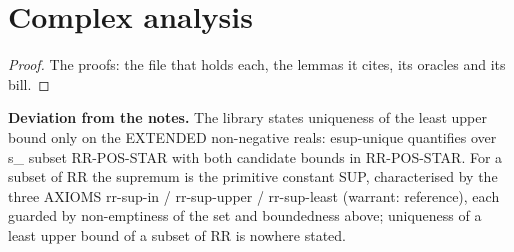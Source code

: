 \section{Complex analysis}
%
\renewcommand{\thethm}{1.2}
\begin{prop}\label{thm:esup-unique}
%
%
\end{prop}
%
\begin{proof}
%
The proofs: the file that holds each, the lemmas it cites, its oracles and its bill.
%
%
%
%
\end{proof}
%
\noindent\textbf{Deviation from the notes.} The library states uniqueness of the least upper bound only on the EXTENDED non-negative reals: esup-unique quantifies over s\_ subset RR-POS-STAR with both candidate bounds in RR-POS-STAR. For a subset of RR the supremum is the primitive constant SUP, characterised by the three AXIOMS rr-sup-in / rr-sup-upper / rr-sup-least (warrant: reference), each guarded by non-emptiness of the set and boundedness above; uniqueness of a least upper bound of a subset of RR is nowhere stated.
%
\renewcommand{\thethm}{1.3}
